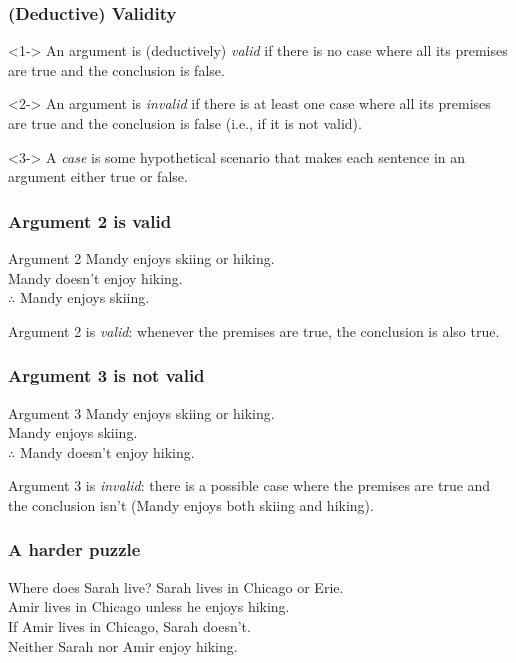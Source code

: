 \begin{frame}
  \frametitle{(Deductive) Validity}

  \begin{definition}<1->
  An argument is (deductively) \emph{valid} if there is no case where all its
  premises are true and the conclusion is false.
  \end{definition}

  \begin{definition}<2->
  An argument is \emph{invalid} if there is at least one case where
  all its premises are true and the conclusion is false (i.e., if it
  is not valid).
  \end{definition}

  \begin{definition}<3->
  A \emph{case} is some hypothetical scenario that makes each sentence
  in an argument either true or false.
  \end{definition}
\end{frame}

\begin{frame}
  \frametitle{Argument 2 is valid}

  \begin{block}{Argument 2}
  Mandy enjoys skiing or hiking.\\
  Mandy doesn't enjoy hiking.\\
  $\therefore$ Mandy enjoys skiing.
  \end{block}

Argument 2 is \emph{valid}: whenever the premises are
true, the conclusion is also true.

\end{frame}

\begin{frame}
  \frametitle{Argument 3 is not valid}

  \begin{block}{Argument 3}
  Mandy enjoys skiing or hiking.\\
  Mandy enjoys skiing.\\
  $\therefore$ Mandy doesn't enjoy hiking.
  \end{block}

  Argument 3 is \emph{invalid}: there is a possible case where the
  premises are true and the conclusion isn't (Mandy enjoys both skiing
  and hiking).

\end{frame}

\begin{frame}
  \frametitle{A harder puzzle}

  \begin{block}{Where does Sarah live?}
  Sarah lives in Chicago or Erie.\\
  Amir lives in Chicago unless he enjoys hiking.\\
  If Amir lives in Chicago, Sarah doesn't.\\
  Neither Sarah nor Amir enjoy hiking.
  \end{block}

\end{frame}


